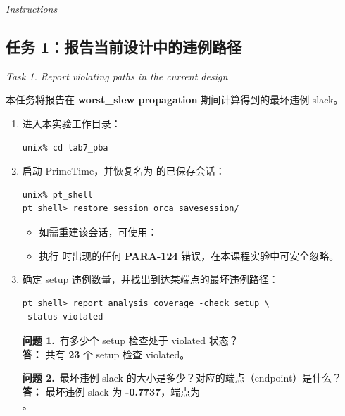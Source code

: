 \noindent\textit{Instructions}

\subsection{任务 1：报告当前设计中的违例路径}
\label{lab7:task1}

\noindent\textit{Task 1. Report violating paths in the current design}

本任务将报告在 \textbf{worst\_slew propagation} 期间计算得到的最坏违例 slack。

\begin{enumerate}
  \item 进入本实验工作目录：
\begin{lstlisting}
unix% cd lab7_pba
\end{lstlisting}

  \item 启动 PrimeTime，并恢复名为  的已保存会话：
\begin{lstlisting}
unix% pt_shell
pt_shell> restore_session orca_savesession/
\end{lstlisting}

\begin{noteBox}
\begin{itemize}
  \item 如需重建该会话，可使用：\\
  \item 执行  时出现的任何 \textbf{PARA-124} 错误，在本课程实验中可安全忽略。
\end{itemize}
\end{noteBox}

  \item 确定 setup 违例数量，并找出到达某端点的最坏违例路径：
\begin{lstlisting}
pt_shell> report_analysis_coverage -check setup \
-status violated
\end{lstlisting}

\begin{questionBox}
\textbf{问题 1.}\ 有多少个 setup 检查处于 violated 状态？\\[0.35em]
\textbf{答：} 共有 \textbf{23} 个 setup 检查 violated。

\textbf{问题 2.}\ 最坏违例 slack 的大小是多少？对应的端点（endpoint）是什么？\\[0.35em]
\textbf{答：} 最坏违例 slack 为 \textbf{-0.7737}，端点为\\
。
\end{questionBox}
\end{enumerate}

